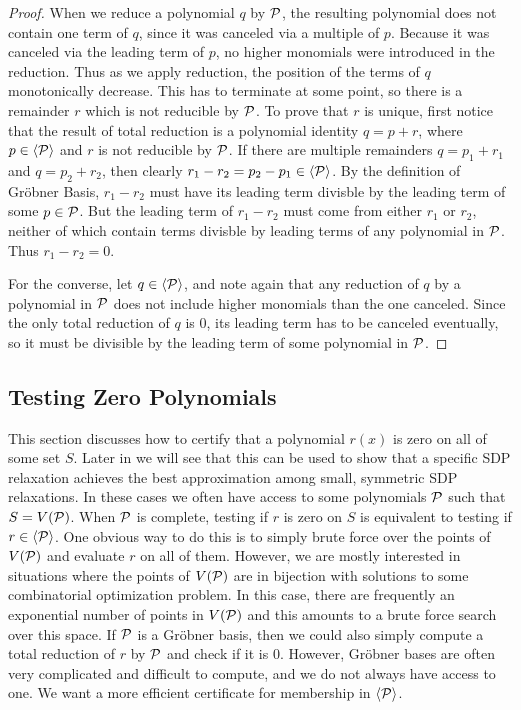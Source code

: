 \begin{proof}
When we reduce a polynomial $q$ by $\mathcal P$, the resulting polynomial does not contain one term of $q$, since it was canceled via a multiple of $p$. Because it was canceled via the leading term of $p$, no higher monomials were introduced in the reduction. Thus as we apply reduction, the position of the terms of $q$ monotonically decrease. This has to terminate at some point, so there is a remainder $r$ which is not reducible by $\mathcal P$. To prove that $r$ is unique, first notice that the result of total reduction is a polynomial identity $q = p + r$, where $p \in \langle \mathcal P \rangle$ and $r$ is not reducible by $\mathcal P$. If there are multiple remainders $q = p_1 + r_1$ and $q = p_2 + r_2$, then clearly $r_1 - r_2 = p_2 - p_1 \in \langle \mathcal P \rangle$. By the definition of Gr\"obner Basis, $r_1 - r_2$ must have its leading term divisble by the leading term of some $p \in \mathcal P$. But the leading term of $r_1 - r_2$ must come from either $r_1$ or $r_2$, neither of which contain terms divisble by leading terms of any polynomial in $\mathcal P$. Thus $r_1 - r_2 = 0$.

For the converse, let $q \in \langle \mathcal P \rangle$, and note again that any reduction of $q$ by a polynomial in $\mathcal P$ does not include higher monomials than the one canceled. Since the only total reduction of $q$ is $0$, its leading term has to be canceled eventually, so it must be divisible by the leading term of some polynomial in $\mathcal P$.
\end{proof}

\subsection{Testing Zero Polynomials}

This section discusses how to certify that a polynomial $r(x)$ is zero on all of some set $S$. Later in  we will see that this can be used to show that a specific SDP relaxation achieves the best approximation among small, symmetric SDP relaxations. 
In these cases we often have access to some polynomials $\mathcal P$ such that $S = V(\mathcal P)$.
When $\mathcal P$ is complete, testing if $r$ is zero on $S$ is equivalent to testing if $r \in \langle \mathcal P \rangle$.
One obvious way to do this is to simply brute force over the points of $V(\mathcal P)$ and evaluate $r$ on all of them. 
However, we are mostly interested in situations where the points of $V(\mathcal P)$ are in bijection with solutions to some combinatorial optimization problem.
In this case, there are frequently an exponential number of points in $V(\mathcal P)$ and this amounts to a brute force search over this space. 
If $\mathcal P$ is a Gr\"obner basis, then we could also simply compute a total reduction of $r$ by $\mathcal P$ and check if it is $0$.
However, Gr\"obner bases are often very complicated and difficult to compute, and we do not always have access to one.
We want a more efficient certificate for membership in $\langle \mathcal P \rangle$. 

